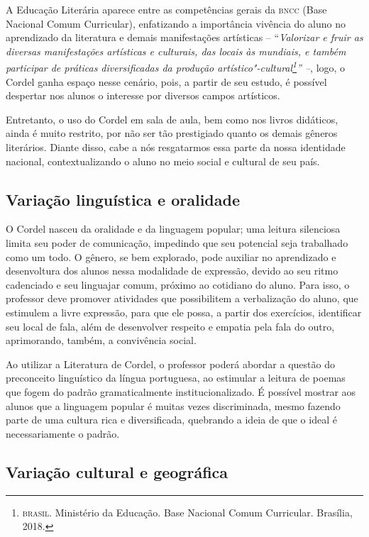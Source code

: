 \documentclass[12pt]{extarticle}
\begin{document}
A Educação Literária aparece entre as competências gerais da \textsc{bncc} (Base
Nacional Comum Curricular), enfatizando a importância vivência do aluno
no aprendizado da literatura e demais manifestações artísticas --
``\emph{Valorizar e fruir as diversas manifestações artísticas e
culturais, das locais às mundiais, e também participar de práticas
diversificadas da produção artístico"-cultural\footnote{\textsc{brasil}. Ministério da Educação. Base Nacional Comum Curricular.
Brasília, 2018.}'' --},
logo, o Cordel ganha espaço nesse cenário, pois, a partir de seu estudo,
é possível despertar nos alunos o interesse por diversos campos
artísticos.

Entretanto, o uso do Cordel em sala de aula, bem como nos livros
didáticos, ainda é muito restrito, por não ser tão prestigiado quanto os
demais gêneros literários. Diante disso, cabe a nós resgatarmos essa
parte da nossa identidade nacional, contextualizando o aluno no meio
social e cultural de seu país.

\subsection{Variação linguística e oralidade}

O Cordel nasceu da oralidade e da linguagem popular; uma leitura
silenciosa limita seu poder de comunicação, impedindo que seu potencial
seja trabalhado como um todo. O gênero, se bem explorado, pode auxiliar
no aprendizado e desenvoltura dos alunos nessa modalidade de expressão,
devido ao seu ritmo cadenciado e seu linguajar comum, próximo ao
cotidiano do aluno. Para isso, o professor deve promover atividades que
possibilitem a verbalização do aluno, que estimulem a livre expressão,
para que ele possa, a partir dos exercícios, identificar seu local de
fala, além de desenvolver respeito e empatia pela fala do outro,
aprimorando, também, a convivência social.

Ao utilizar a Literatura de Cordel, o professor poderá abordar a questão
do preconceito linguístico da língua portuguesa, ao estimular a leitura
de poemas que fogem do padrão gramaticalmente institucionalizado. É
possível mostrar aos alunos que a linguagem popular é muitas vezes
discriminada, mesmo fazendo parte de uma cultura rica e diversificada,
quebrando a ideia de que o ideal é necessariamente o padrão.

\subsection{Variação cultural e geográfica}
\end{document}
